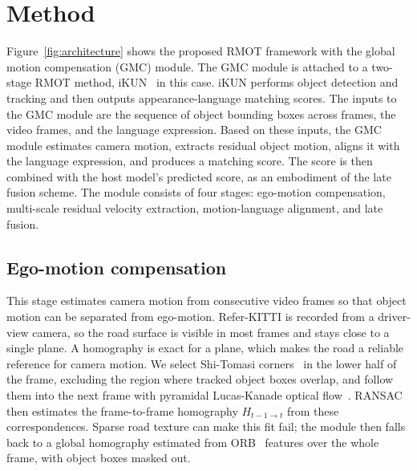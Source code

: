 \documentclass{article}
\begin{document}



\section{Method}
\label{sec:method}
Figure~\ref{fig:architecture} shows the proposed RMOT framework with the global motion compensation (GMC) module. The GMC module is attached to a two-stage RMOT method, iKUN~\cite{ikun} in this case. iKUN performs object detection and tracking and then outputs appearance-language matching scores. The inputs to the GMC module are the sequence of object bounding boxes across frames, the video frames, and the language expression. Based on these inputs, the GMC module estimates camera motion, extracts residual object motion, aligns it with the language expression, and produces a matching score. The score is then combined with the host model's predicted score, as an embodiment of the late fusion scheme. The module consists of four stages: ego-motion compensation, multi-scale residual velocity extraction, motion-language alignment, and late fusion.


\subsection{Ego-motion compensation}
\label{sec:ego}
This stage estimates camera motion from consecutive video frames so that object motion can be separated from ego-motion. Refer-KITTI is recorded from a driver-view camera, so the road surface is visible in most frames and stays close to a single plane. A homography is exact for a plane, which makes the road a reliable reference for camera motion. We select Shi-Tomasi corners~\cite{shitomasi} in the lower half of the frame, excluding the region where tracked object boxes overlap, and follow them into the next frame with pyramidal Lucas-Kanade optical flow~\cite{lucaskanade}. RANSAC~\cite{ransac} then estimates the frame-to-frame homography $H_{t-1 \to t}$ from these correspondences. Sparse road texture can make this fit fail; the module then falls back to a global homography estimated from ORB~\cite{orb} features over the whole frame, with object boxes masked out.
\end{document}
